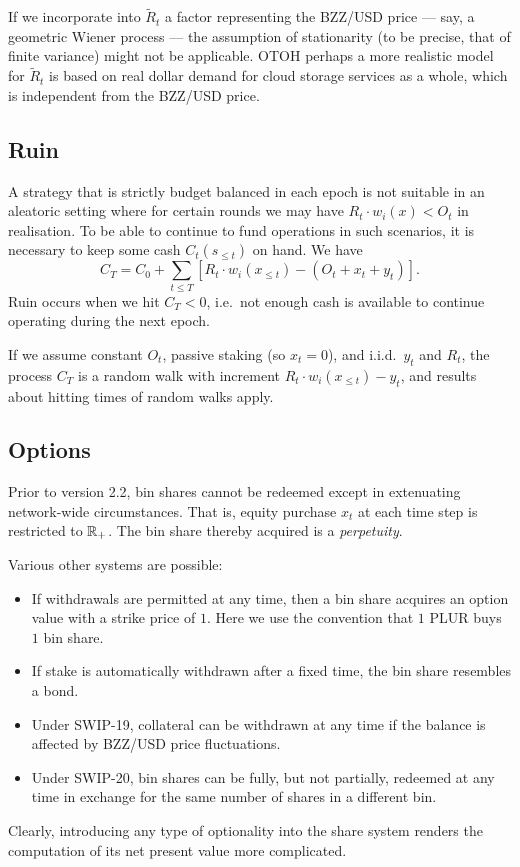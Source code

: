 \begin{remark}

  If we incorporate into $\tilde R_t$ a factor representing the BZZ/USD price --- say, a geometric Wiener process --- the assumption of stationarity (to be precise, that of finite variance) might not be applicable.
  OTOH perhaps a more realistic model for $\tilde R_t$ is based on real dollar demand for cloud storage services as a whole, which is independent from the BZZ/USD price.

\end{remark}

\subsection{Ruin}

A strategy that is strictly budget balanced in each epoch is not suitable in an aleatoric setting where for certain rounds we may have $R_t\cdot w_i(x) < O_t$ in realisation.
%
To be able to continue to fund operations in such scenarios, it is necessary to keep some cash $C_t(s_{\leq t})$ on hand.
%
We have
\[
  C_T = C_0 + \sum_{t\leq T} \left[ R_t\cdot w_i(x_{\leq t}) - (O_t + x_t + y_t) \right].
\]
Ruin occurs when we hit $C_T < 0$, i.e.~not enough cash is available to continue operating during the next epoch.

If we assume constant $O_t$, passive staking (so $x_t = 0$), and i.i.d.~$y_t$ and $R_t$, the process $C_T$ is a random walk with increment $R_t\cdot w_i(x_{\leq t}) - y_t$, and results about hitting times of random walks apply.

\subsection{Options}

Prior to version 2.2, bin shares cannot be redeemed except in extenuating network-wide circumstances.
%
That is, equity purchase $x_t$ at each time step is restricted to $\mathbb{R}_+$.
%
The bin share thereby acquired is a \emph{perpetuity}.

Various other systems are possible:
%
\begin{itemize}
  \item 
    If withdrawals are permitted at any time, then a bin share acquires an option value with a strike price of $1$.
    Here we use the convention that $1$ PLUR buys $1$ bin share.

  \item
    If stake is automatically withdrawn after a fixed time, the bin share resembles a bond.

  \item
    Under SWIP-19, collateral can be withdrawn at any time if the balance is affected by BZZ/USD  price fluctuations.
    
  \item
    Under SWIP-20, bin shares can be fully, but not partially, redeemed at any time in exchange for the same number of shares in a different bin.
\end{itemize}
%
Clearly, introducing any type of optionality into the share system renders the computation of its net present value more complicated.

